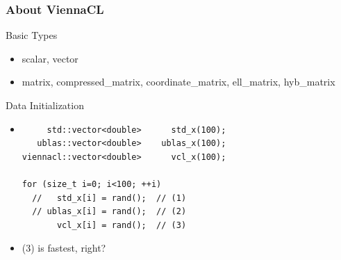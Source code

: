 \begin{frame}[fragile]
\frametitle{About ViennaCL}

 \begin{block}{Basic Types}
   \begin{itemize}
    \item scalar, vector
    \item matrix, compressed\_matrix, coordinate\_matrix, ell\_matrix, hyb\_matrix
   \end{itemize}
 \end{block}

 \begin{block}{Data Initialization}
    \begin{itemize}
    \item  { 
  \begin{lstlisting}
     std::vector<double>      std_x(100);
   ublas::vector<double>    ublas_x(100);
viennacl::vector<double>      vcl_x(100);

for (size_t i=0; i<100; ++i)
  //   std_x[i] = rand();  // (1)
  // ublas_x[i] = rand();  // (2)
       vcl_x[i] = rand();  // (3)

  \end{lstlisting} }
    \item (3) is fastest, right?
 \end{itemize}

 \end{block}
\end{frame}






